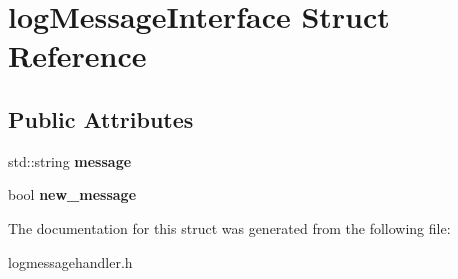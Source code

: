 \hypertarget{structlog_message_interface}{}\section{log\+Message\+Interface Struct Reference}
\label{structlog_message_interface}
\subsection*{Public Attributes}
\begin{DoxyCompactItemize}
\item 
\mbox{\label{structlog_message_interface_a03ab15f58f5fdac1407fe5e0acb63f17}} 
std\+::string {\bfseries message}
\item 
\mbox{\label{structlog_message_interface_af729a2f0794338fc830669d54c1bc7b6}} 
bool {\bfseries new\+\_\+message}
\end{DoxyCompactItemize}


The documentation for this struct was generated from the following file\+:\begin{DoxyCompactItemize}
\item 
logmessagehandler.\+h\end{DoxyCompactItemize}
